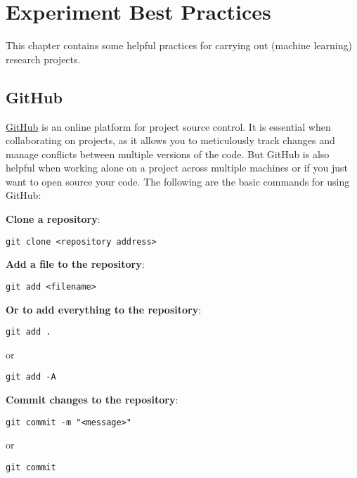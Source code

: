 \chapter{Experiment Best Practices}

This chapter contains some helpful practices for carrying out (machine learning) research projects.

\section{GitHub}

\href{https://github.com/}{GitHub} is an online platform for project source control. It is essential when collaborating on projects, as it allows you to meticulously track changes and manage conflicts between multiple versions of the code. But GitHub is also helpful when working alone on a project across multiple machines or if you just want to open source your code. The following are the basic commands for using GitHub:
\newline

\noindent \textbf{Clone a repository}:

\begin{lstlisting}[style=python]
git clone <repository address>
\end{lstlisting}

\noindent \textbf{Add a file to the repository}:

\begin{lstlisting}[style=python]
git add <filename>
\end{lstlisting}

\noindent \textbf{Or to add everything to the repository}:

\begin{lstlisting}[style=python]
git add .
\end{lstlisting}

or

\begin{lstlisting}[style=python]
git add -A
\end{lstlisting}

\noindent \textbf{Commit changes to the repository}:

\begin{lstlisting}[style=python]
git commit -m "<message>"
\end{lstlisting}

or

\begin{lstlisting}[style=python]
git commit
\end{lstlisting}

